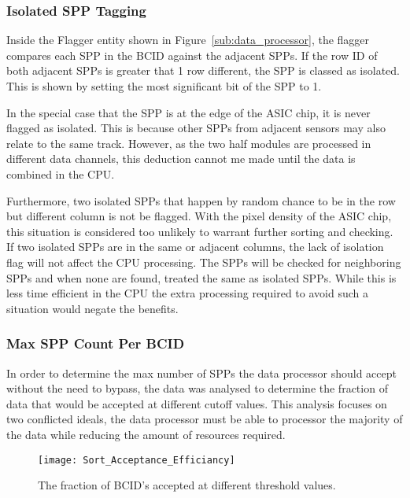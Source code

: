 
			\subsubsection{Isolated SPP Tagging} %
			\label{sub:isolated_spp_tagging}
			
			Inside the Flagger entity shown in Figure~\ref{sub:data_processor}, the flagger compares each SPP in the BCID against the adjacent SPPs.
			If the row ID of both adjacent SPPs is greater that 1 row different, the SPP is classed as isolated.
			This is shown by setting the most significant bit of the SPP to 1.

			In the special case that the SPP is at the edge of the ASIC chip, it is never flagged as isolated.
			This is because other SPPs from adjacent sensors may also relate to the same track.
			However, as the two half modules are processed in different data channels, this deduction cannot me made until the data is combined in the CPU.

			Furthermore, two isolated SPPs that happen by random chance to be in the row but different column is not be flagged.
			With the pixel density of the ASIC chip, this situation is considered too unlikely to warrant further sorting and checking.
			If two isolated SPPs are in the same or adjacent columns, the lack of isolation flag will not affect the CPU processing.
			The SPPs will be checked for neighboring SPPs and when none are found, treated the same as isolated SPPs.
			While this is less time efficient in the CPU the extra processing required to avoid such a situation would negate the benefits.

			\subsubsection{Max SPP Count Per BCID} %
			\label{sub:max_spp_count_per_bcid}
			
			In order to determine the max number of SPPs the data processor should accept without the need to bypass, the data was analysed to determine the fraction of data that would be accepted at different cutoff values.
			This analysis focuses on two conflicted ideals, the data processor must be able to processor the majority of the data while reducing the amount of resources required.

			\begin{figure}[ht]
				\centering
				\texttt{[image: Sort\_Acceptance\_Efficiancy]}
				\caption{The fraction of BCID's accepted at different threshold values.}
				\label{fig:sort_acceptance}
			\end{figure}

